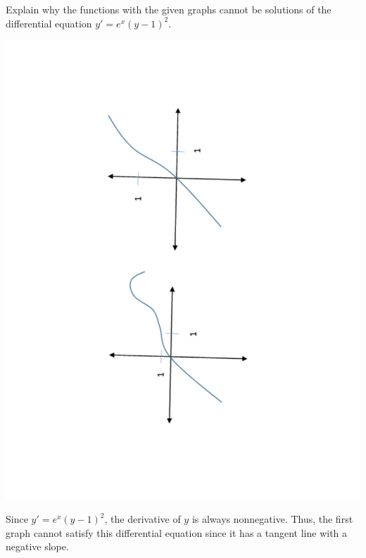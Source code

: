 \documentclass[]{ximera}
\begin{document}
\begin{problem}
Explain why the functions with the given graphs cannot be solutions of the differential equation $y' = e^x (y-1)^2$.
	\begin{image}
	\includegraphics[trim= 170 200 190 180, scale=0.8, angle=-88.69]{Figure8-1-1.pdf}	
	\end{image}

	\begin{freeResponse}
	Since $y' = e^x (y-1)^2$, the derivative of $y$ is always nonnegative.  
	Thus, the first graph cannot satisfy this differential equation since it has a tangent line with a negative slope.
	

\end{freeResponse}
\end{problem}
\end{document}
